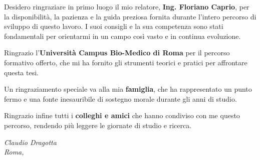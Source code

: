 \begin{onehalfspace}

Desidero ringraziare in primo luogo il mio relatore, \textbf{Ing. Floriano Caprio}, per la disponibilità, la pazienza e la guida preziosa fornita durante l'intero percorso di sviluppo di questo lavoro. I suoi consigli e la sua competenza sono stati fondamentali per orientarmi in un campo così vasto e in continua evoluzione.

Ringrazio l'\textbf{Università Campus Bio-Medico di Roma} per il percorso formativo offerto, che mi ha fornito gli strumenti teorici e pratici per affrontare questa tesi.

Un ringraziamento speciale va alla mia \textbf{famiglia}, che ha rappresentato un punto fermo e una fonte inesauribile di sostegno morale durante gli anni di studio.

Ringrazio infine tutti i \textbf{colleghi e amici} che hanno condiviso con me questo percorso, rendendo più leggere le giornate di studio e ricerca.

\vspace{1cm}
\raggedleft
\textit{Claudio Dragotta} \\
\textit{Roma, \the\year}

\end{onehalfspace}
